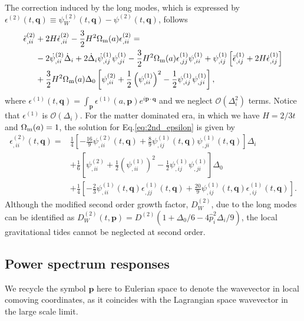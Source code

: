 \documentclass[a4paper,11pt]{article}
\newcommand{\vq}{{\bm q}}
\newcommand{\vp}{{\bm p}}
\begin{document}
The correction induced by the long modes, which is expressed by $\epsilon^{(2)}(t, \vq)\equiv \psi_W^{(2)}(t, \vq) - \psi^{(2)}(t, \vq)$, 
follows
\begin{align}
\ddot \epsilon^{(2)}_{,ii} &+ 2H \dot \epsilon^{(2)}_{,ii} - \frac32 H^2 \Omega_{\rm m}(a) \epsilon_{,ii}^{(2)}=
\nonumber\\
&-2\dot\psi^{(2)}_{,ii} \dot\Delta_i + 2\dot\Delta_i\dot\psi_{,ij}^{(1)}\psi_{,ji}^{(1)}
-\frac32 H^2 \Omega_{\rm m}(a) \epsilon^{(1)}_{,jj}\psi^{(1)}_{,ii} + \psi^{(1)}_{,ij} \left[ \ddot\epsilon_{,ij}^{(1)} + 2H\dot\epsilon_{,ij}^{(1)} \right]
\nonumber\\
&+\frac32 H^2 \Omega_{\rm m}(a)\Delta_0\left[ \psi_{,ii}^{(2)} + \frac12\left( \psi^{(1)}_{,ii}\right)^2- \frac12\psi^{(1)}_{,ij}\psi^{(1)}_{,ji} \right],
\label{eq:2nd_epsilon}
\end{align}
where $\epsilon^{(1)}(t,\vq) = \int_\vp \epsilon^{(1)}(a, \vp)e^{i\vp\cdot\vq}$
and we neglect $\mathcal{O}(\Delta_i^2)$ terms.
Notice that $\epsilon^{(1)}$ is $\mathcal{O}(\Delta_i)$.
For the matter dominated era, in which we have $H=2/3t$ and $\Omega_{\rm m}(a)=1$,
the solution for Eq.\eqref{eq:2nd_epsilon} is given by
\begin{align}
\epsilon^{(2)}_{,ii}(t, \vq)
=&\frac14 \left[-\frac{16}{9}\psi^{(2)}_{,ii}(t,\vq) + \frac89\psi^{(1)}_{,ij}(t,\vq)\psi^{(1)}_{,ji}(t,\vq) \right]\Delta_i
\nonumber\\
&+\frac16 \left[\psi_{,ii}^{(2)} + \frac12\left( \psi^{(1)}_{,ii}\right)^2- \frac12\psi^{(1)}_{,ij}\psi^{(1)}_{,ji}   \right]\Delta_0
\nonumber\\
&+\frac14\left[-\frac23\psi^{(1)}_{,ii}(t,\vq)\epsilon_{,jj}^{(1)}(t,\vq) + \frac{20}{9}\psi^{(1)}_{,ij}(t,\vq)\epsilon_{,ij}^{(1)}(t,\vq)  \right].
\end{align}
Although the modified second order growth factor, $D^{(2)}_W$, due to the long modes can be identified as $D^{(2)}_W (t, \vp) = D^{(2)}(1 + \Delta_0/6 - 4\hat{p}_i^2\Delta_i/9 )$, the local gravitational tides cannot be neglected at second order.


\subsection{Power spectrum responses}
\label{sub:resp}

We recycle the symbol $\vp$ here to Eulerian space to denote the wavevector in
local comoving coordinates, as it coincides with the Lagrangian space
wavevector in the large scale limit.
\end{document}

